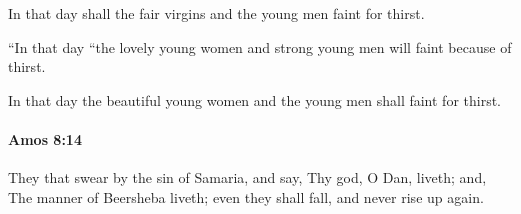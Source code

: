 			\begin{versebox}
					\item[BHS] 
					\item[LXX] 
					\item[ASV] In that day shall the fair virgins and the young men faint for thirst.
					\item[NIV] “In that day “the lovely young women and strong young men will faint because of thirst.
					\item[NRSV] In that day the beautiful young women and the young men shall faint for thirst.
			\end{versebox}

		\paragraph{Amos 8:14} %
			\label{AMOS-8-14}

			They that swear by the sin of Samaria, and say, Thy god, O Dan, liveth; and, The manner of Beersheba liveth; even they shall fall, and never rise up again.

